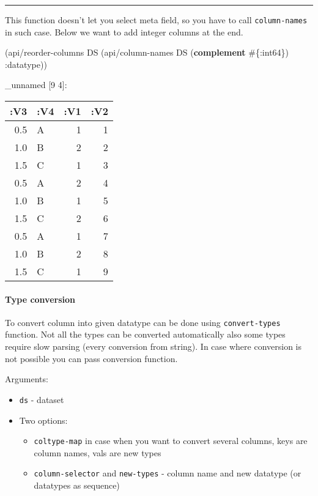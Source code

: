 \documentclass[]{article}
\newenvironment{Shaded}{\begin{snugshade}}{\end{snugshade}}
\newcommand{\KeywordTok}[1]{\textcolor[rgb]{0.13,0.29,0.53}{\textbf{#1}}}
\newcommand{\AttributeTok}[1]{\textcolor[rgb]{0.77,0.63,0.00}{#1}}
\newcommand{\NormalTok}[1]{#1}
\providecommand{\tightlist}{%
  \setlength{\itemsep}{0pt}\setlength{\parskip}{0pt}}
\let\oldparagraph\paragraph
\renewcommand{\paragraph}[1]{\oldparagraph{#1}\mbox{}}
\begin{document}
\begin{center}\rule{0.5\linewidth}{0.5pt}\end{center}

This function doesn't let you select meta field, so you have to call
\texttt{column-names} in such case. Below we want to add integer columns
at the end.

\begin{Shaded}
\begin{Highlighting}[]
\NormalTok{(api/reorder-columns DS (api/column-names DS (}\KeywordTok{complement}\NormalTok{ #\{}\AttributeTok{:int64}\NormalTok{\}) }\AttributeTok{:datatype}\NormalTok{))}
\end{Highlighting}
\end{Shaded}

\_unnamed {[}9 4{]}:

\begin{longtable}[]{@{}rlrr@{}}
\toprule
:V3 & :V4 & :V1 & :V2\tabularnewline
\midrule
\endhead
0.5 & A & 1 & 1\tabularnewline
1.0 & B & 2 & 2\tabularnewline
1.5 & C & 1 & 3\tabularnewline
0.5 & A & 2 & 4\tabularnewline
1.0 & B & 1 & 5\tabularnewline
1.5 & C & 2 & 6\tabularnewline
0.5 & A & 1 & 7\tabularnewline
1.0 & B & 2 & 8\tabularnewline
1.5 & C & 1 & 9\tabularnewline
\bottomrule
\end{longtable}

\paragraph{Type conversion}\label{type-conversion}

To convert column into given datatype can be done using
\texttt{convert-types} function. Not all the types can be converted
automatically also some types require slow parsing (every conversion
from string). In case where conversion is not possible you can pass
conversion function.

Arguments:

\begin{itemize}
\tightlist
\item
  \texttt{ds} - dataset
\item
  Two options:

  \begin{itemize}
  \tightlist
  \item
    \texttt{coltype-map} in case when you want to convert several
    columns, keys are column names, vals are new types
  \item
    \texttt{column-selector} and \texttt{new-types} - column name and
    new datatype (or datatypes as sequence)
  \end{itemize}
\end{itemize}
\end{document}
